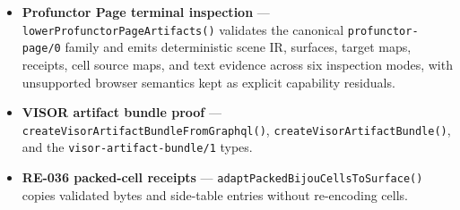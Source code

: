 \begin{itemize}
\tightlist
\item
  \textbf{Profunctor Page terminal inspection} --- \texttt{l\allowbreak{}o\allowbreak{}w\allowbreak{}e\allowbreak{}r\allowbreak{}P\allowbreak{}r\allowbreak{}o\allowbreak{}f\allowbreak{}u\allowbreak{}n\allowbreak{}c\allowbreak{}t\allowbreak{}o\allowbreak{}r\allowbreak{}P\allowbreak{}a\allowbreak{}g\allowbreak{}e\allowbreak{}A\allowbreak{}r\allowbreak{}t\allowbreak{}i\allowbreak{}f\allowbreak{}a\allowbreak{}c\allowbreak{}t\allowbreak{}s\allowbreak{}(\allowbreak{})} validates the canonical \texttt{p\allowbreak{}r\allowbreak{}o\allowbreak{}f\allowbreak{}u\allowbreak{}n\allowbreak{}c\allowbreak{}t\allowbreak{}o\allowbreak{}r\allowbreak{}-\allowbreak{}p\allowbreak{}a\allowbreak{}g\allowbreak{}e\allowbreak{}/\allowbreak{}0} family and emits deterministic scene IR, surfaces, target maps, receipts, cell source maps, and text evidence across six inspection modes, with unsupported browser semantics kept as explicit capability residuals.
\item
  \textbf{VISOR artifact bundle proof} --- \texttt{c\allowbreak{}r\allowbreak{}e\allowbreak{}a\allowbreak{}t\allowbreak{}e\allowbreak{}V\allowbreak{}i\allowbreak{}s\allowbreak{}o\allowbreak{}r\allowbreak{}A\allowbreak{}r\allowbreak{}t\allowbreak{}i\allowbreak{}f\allowbreak{}a\allowbreak{}c\allowbreak{}t\allowbreak{}B\allowbreak{}u\allowbreak{}n\allowbreak{}d\allowbreak{}l\allowbreak{}e\allowbreak{}F\allowbreak{}r\allowbreak{}o\allowbreak{}m\allowbreak{}G\allowbreak{}r\allowbreak{}a\allowbreak{}p\allowbreak{}h\allowbreak{}q\allowbreak{}l\allowbreak{}(\allowbreak{})}, \texttt{c\allowbreak{}r\allowbreak{}e\allowbreak{}a\allowbreak{}t\allowbreak{}e\allowbreak{}V\allowbreak{}i\allowbreak{}s\allowbreak{}o\allowbreak{}r\allowbreak{}A\allowbreak{}r\allowbreak{}t\allowbreak{}i\allowbreak{}f\allowbreak{}a\allowbreak{}c\allowbreak{}t\allowbreak{}B\allowbreak{}u\allowbreak{}n\allowbreak{}d\allowbreak{}l\allowbreak{}e\allowbreak{}(\allowbreak{})}, and the \texttt{v\allowbreak{}i\allowbreak{}s\allowbreak{}o\allowbreak{}r\allowbreak{}-\allowbreak{}a\allowbreak{}r\allowbreak{}t\allowbreak{}i\allowbreak{}f\allowbreak{}a\allowbreak{}c\allowbreak{}t\allowbreak{}-\allowbreak{}b\allowbreak{}u\allowbreak{}n\allowbreak{}d\allowbreak{}l\allowbreak{}e\allowbreak{}/\allowbreak{}1} types.
\item
  \textbf{RE-036 packed-cell receipts} --- \texttt{a\allowbreak{}d\allowbreak{}a\allowbreak{}p\allowbreak{}t\allowbreak{}P\allowbreak{}a\allowbreak{}c\allowbreak{}k\allowbreak{}e\allowbreak{}d\allowbreak{}B\allowbreak{}i\allowbreak{}j\allowbreak{}o\allowbreak{}u\allowbreak{}C\allowbreak{}e\allowbreak{}l\allowbreak{}l\allowbreak{}s\allowbreak{}T\allowbreak{}o\allowbreak{}S\allowbreak{}u\allowbreak{}r\allowbreak{}f\allowbreak{}a\allowbreak{}c\allowbreak{}e\allowbreak{}(\allowbreak{})} copies validated bytes and side-table entries without re-encoding cells.

\end{itemize}
